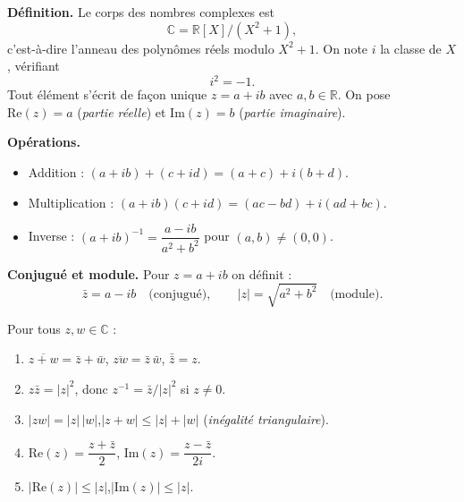 


\begin{tcolorbox}[thmbox]
  \textbf{Définition.}\enspace{}
  Le corps des nombres complexes est
  \[
    \mathbb{C} = \mathbb{R}[X]/(X^2+1),
  \]
  c'est-à-dire l'anneau des polynômes réels modulo $X^2+1$.
  On note $i$ la classe de $X$, vérifiant
  \[
    \boxed{i^2 = -1.}
  \]
  Tout élément s'écrit de façon unique $z = a + ib$ avec $a,b\in\mathbb{R}$.
  On pose $\mathrm{Re}(z)=a$ (\emph{partie réelle}) et
  $\mathrm{Im}(z)=b$ (\emph{partie imaginaire}).

  \medskip
  \textbf{Opérations.}
  \begin{itemize}
    \item Addition : $(a+ib)+(c+id) = (a+c)+i(b+d)$.
    \item Multiplication : $(a+ib)(c+id) = (ac-bd)+i(ad+bc)$.
    \item Inverse : ${(a+ib)}^{-1} = \dfrac{a-ib}{a^2+b^2}$ pour $(a,b)\neq(0,0)$.
  \end{itemize}

  \medskip
  \textbf{Conjugué et module.}\enspace{}
  Pour $z = a+ib$ on définit :
  \[
    \bar z = a - ib \quad\text{(conjugué)},\qquad
    |z| = \sqrt{a^2+b^2} \quad\text{(module)}.
  \]
\end{tcolorbox}


\begin{mdframed}[style=proofbar]
  Pour tous $z, w \in \mathbb{C}$ :
  \begin{enumerate}
    \item $\overline{z+w} = \bar z + \bar w$,\quad
          $\overline{zw} = \bar z\,\bar w$,\quad
          $\bar{\bar z} = z$.
    \item $z\bar z = |z|^2$, donc $z^{-1} = \bar z / |z|^2$ si $z\neq 0$.
    \item $|zw| = |z|\,|w|$,\quad $|z+w| \leq |z|+|w|$
          (\emph{inégalité triangulaire}).
    \item $\mathrm{Re}(z) = \dfrac{z+\bar z}{2}$,\quad
          $\mathrm{Im}(z) = \dfrac{z-\bar z}{2i}$.
    \item $|\mathrm{Re}(z)| \leq |z|$,\quad $|\mathrm{Im}(z)| \leq |z|$.
  \end{enumerate}
\end{mdframed}

